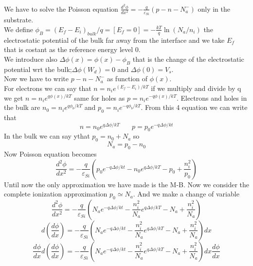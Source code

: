 We have to solve the Poisson equation $\frac{d^2\phi}{dx^2}=-\frac{q}{\varepsilon_{Si}}(p-n-N_a^-)$ only in the substrate.\\
We define $\phi_B=(E_f-E_i)_{bulk}/q=[E_f=0]=-\frac{kT}{q}\ln(N_a/n_i)$ the electrostatic potential of the bulk far away from the interface and we take $E_f$ that is costant as the reference energy level 0.\\
We introduce also $\Delta \phi (x)=\phi(x)-\phi_B$  that is the change of the electrostatic potential wrt the bulk;$\Delta \phi (W_d)=0$ and $\Delta \phi (0)=V_s$.\\
\vspace{5mm}
Now we have to write $p-n-N_a^-$ as function of $\phi(x)$.\\
For electrons we can say that $n=n_ie^{(E_f-E_i)/kT}$ if we multiply and divide by q we get $n=n_ie^{q\phi(x)/kT}$ same for holes as $p=n_ie^{-q\phi(x)/kT}$. Electrons and holes in the bulk are $n_0=n_ie^{q\phi_b/kT}$ and $p_0=n_ie^{-q\phi_b/kT}$. From this 4 equation we can write that 
\begin{equation}
n=n_0e^{q\Delta \phi/kT} \ \ \ \ \ \ \ \ p=p_0e^{-q\Delta \phi/kt}
\end{equation}
In the bulk we can say ythat $p_0=n_0+N_a$ so 
\begin{equation}
N_a=p_0-n_0
\end{equation}
Now Poisson equation becomes 
\begin{equation}
\frac{d^2\phi}{dx^2}=-\frac{q}{\varepsilon_{Si}}(p_0e^{-q\Delta \phi/kt}-n_0e^{q\Delta \phi/kT}-p_0+\frac{n_i^2}{p_0})
\end{equation}
Until now the only approximation we have made is the M-B. Now we consider the complete ionization approximation $p_0\simeq N_a$. And we make a change of variable 
\begin{equation}
\frac{d^2\phi}{dx^2}=-\frac{q}{\varepsilon_{Si}}(N_ae^{-q\Delta \phi/kt}-\frac{n_i^2}{N_a}e^{q\Delta \phi/kT}-N_a+\frac{n_i^2}{N_a})
\end{equation}
\begin{equation}
d(\frac{d\phi}{dx})=-\frac{q}{\varepsilon_{Si}}(N_ae^{-q\Delta \phi/kt}-\frac{n_i^2}{N_a}e^{q\Delta \phi/kT}-N_a+\frac{n_i^2}{N_a})dx
\end{equation}
\begin{equation}
\frac{d\phi}{dx}d(\frac{d\phi}{dx})=-\frac{q}{\varepsilon_{Si}}(N_ae^{-q\Delta \phi/kt}-\frac{n_i^2}{N_a}e^{q\Delta \phi/kT}-N_a+\frac{n_i^2}{N_a})dx\frac{d\phi}{dx}
\end{equation}
